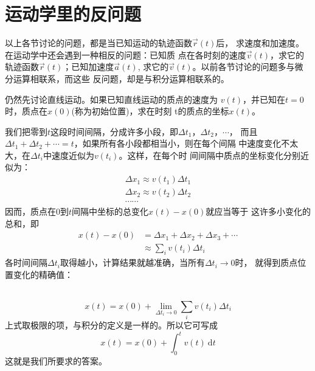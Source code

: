 \section{运动学里的反问题}\label{sec:01.11}

    以上各节讨论的问题，都是当已知运动的轨迹函数$\vec{r}(t)$后，
求速度和加速度。在运动学中还会遇到一种相反的问题：已知质
点在各时刻的速度$\vec{v}(t)$，求它的轨迹函数$\vec{r}(t)$；已知加速度$\vec{a}(t)$,
求它的$\vec{v}(t)$。以前各节讨论的问题多与微分运算相联系，而这些
反问题，却是与积分运算相联系的。

    仍然先讨论直线运动。如果已知直线运动的质点的速度为
$v(t)$，并已知在$t=0$时，质点在$x(0)$(称为初始位置)，求在时刻
t的质点的坐标$x(t)$。

    我们把零到$t$这段时间间隔，分成许多小段，即$\Delta t_1$，$\Delta t_2$，$\cdots$，
而且$\Delta t_1+\Delta t_2+\cdots=t$，如果所有各小段都相当小，则在每个间隔
中速度变化不太大，在$\Delta t_i$中速度近似为$v(t_i)$。这样，在每个时
间间隔中质点的坐标变化分别近似为：
\begin{equation*}
    \begin{array}{l}
        \Delta x_{1} \approx v(t_{1}) \Delta t_{1} \\[-1pt]
        \Delta x_{2} \approx v(t_{2}) \Delta t_{2} \\[-1pt]
        \cdots \cdots
    \end{array}
\end{equation*}
因而，质点在0到$t$间隔中坐标的总变化$x(t)-x(0)$就应当等于
这许多小变化的总和，即\vspace{-0.5em}
\begin{equation}\label{eqn:01.11.01}
    \begin{aligned}
        x(t)-x(0) &=\Delta x_{1}+\Delta x_{2}+\Delta x_{3}+\cdots \\[-1pt]
        & \approx \sum_{i} v\left(t_{i}\right) \Delta t_{i}
    \end{aligned}
\end{equation}
各时间间隔$\Delta t_i$取得越小，计算结果就越准确，当所有$\Delta t_i\rightarrow 0$时，
就得到质点位置变化的精确值：

~\vspace{-1.56em}
\begin{equation}\label{eqn:01.11.02}
    x(t)=x(0)+\lim _{\Delta t_{i} \rightarrow 0} \sum_{i} v\left(t_{i}\right) \Delta t_{i}
\end{equation}
上式取极限的项，与积分的定义是一样的。所以它可写成
\begin{equation}\label{eqn:01.11.03}
    x(t)=x(0)+\int_{0}^{t} v(t) {~\mathrm d}  t
\end{equation}
这就是我们所要求的答案。

